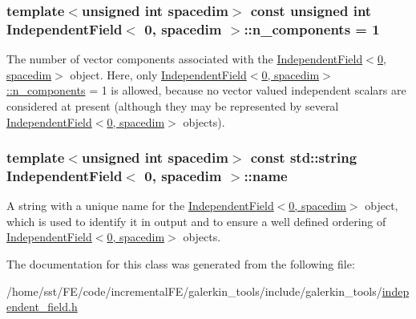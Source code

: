 \subsubsection[{\texorpdfstring{n\+\_\+components}{n_components}}]{\setlength{\rightskip}{0pt plus 5cm}template$<$unsigned int spacedim$>$ const unsigned int {\bf Independent\+Field}$<$ 0, spacedim $>$\+::n\+\_\+components = 1}\hypertarget{class_independent_field_3_010_00_01spacedim_01_4_a248c2226570c71914f5219e7e3052561}{}\label{class_independent_field_3_010_00_01spacedim_01_4_a248c2226570c71914f5219e7e3052561}
The number of vector components associated with the \hyperlink{class_independent_field_3_010_00_01spacedim_01_4}{Independent\+Field$<$0, spacedim$>$} object. Here, only \hyperlink{class_independent_field_3_010_00_01spacedim_01_4_a248c2226570c71914f5219e7e3052561}{Independent\+Field$<$0, spacedim$>$\+::n\+\_\+components} = 1 is allowed, because no vector valued independent scalars are considered at present (although they may be represented by several \hyperlink{class_independent_field_3_010_00_01spacedim_01_4}{Independent\+Field$<$0, spacedim$>$} objects). 
\subsubsection[{\texorpdfstring{name}{name}}]{\setlength{\rightskip}{0pt plus 5cm}template$<$unsigned int spacedim$>$ const std\+::string {\bf Independent\+Field}$<$ 0, spacedim $>$\+::name}\hypertarget{class_independent_field_3_010_00_01spacedim_01_4_a05ecdcc8310253f055fbc59abaa2bc90}{}\label{class_independent_field_3_010_00_01spacedim_01_4_a05ecdcc8310253f055fbc59abaa2bc90}
A string with a unique name for the \hyperlink{class_independent_field_3_010_00_01spacedim_01_4}{Independent\+Field$<$0, spacedim$>$} object, which is used to identify it in output and to ensure a well defined ordering of \hyperlink{class_independent_field_3_010_00_01spacedim_01_4}{Independent\+Field$<$0, spacedim$>$} objects. 

The documentation for this class was generated from the following file\+:\begin{DoxyCompactItemize}
\item 
/home/sst/\+F\+E/code/incremental\+F\+E/galerkin\+\_\+tools/include/galerkin\+\_\+tools/\hyperlink{independent__field_8h}{independent\+\_\+field.\+h}\end{DoxyCompactItemize}

